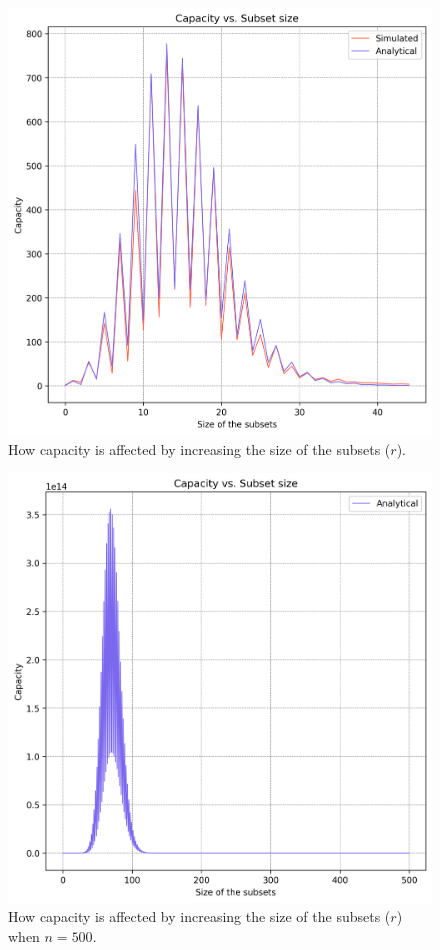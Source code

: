     \begin{figure}%
        \centering
        \includegraphics[scale=0.85]{figures/cap-vs-r.png}
        \caption[Capacity vs. Size of the subsets ($r$)]{How capacity is affected by increasing the size of the subsets ($r$).}
        \label{figure:cap-vs-r}
        \end{figure}

    \begin{figure}%
            \centering
            \includegraphics[scale=0.85]{figures/larger-n.png}
            \caption[Capacity vs. Size of the subsets ($r$) for $n = 500$]{How capacity is affected by increasing the size of the subsets ($r$) when $n = 500$.}
            \label{figure:larger-n}
            \end{figure}

